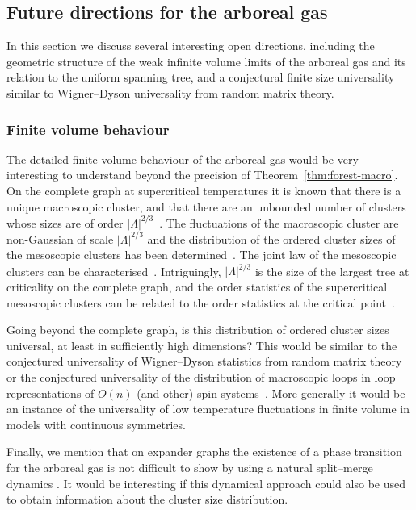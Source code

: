 \documentclass[11pt]{amsart}
\numberwithin{equation}{section}
\numberwithin{theorem}{section}
\newcommand{\1}{{\bf 1}}
\begin{document}
\subsection{Future directions for the arboreal gas}
\label{sec:conn-open-direct}

In this section we discuss several interesting open directions,
including the geometric structure of the weak infinite volume limits
of the arboreal gas and its relation to the uniform spanning tree, and
a conjectural finite size universality similar to Wigner--Dyson
universality from random matrix theory.

\subsubsection*{Finite volume behaviour}

The detailed finite volume behaviour of the arboreal gas would be very
interesting to understand beyond the precision of
Theorem~\ref{thm:forest-macro}.  On the complete graph at
supercritical temperatures it is known that there is a unique macroscopic
cluster, and that there are an unbounded number of clusters whose
sizes are of order $|\Lambda|^{2/3}$~\cite{MR1167294}. The
fluctuations of the macroscopic cluster are non-Gaussian of scale
$|\Lambda|^{2/3}$ and the distribution of the ordered cluster sizes of
the mesoscopic clusters has been determined~\cite{MR1167294}. The
joint law of the mesoscopic clusters can be
characterised~\cite[Section~1.4.3]{MR3845513}. Intriguingly, $|\Lambda|^{2/3}$ is the size of the largest tree at criticality on
the complete graph, and the order statistics of the supercritical
mesoscopic clusters can be related to the order statistics at
the critical point~\cite[Section~1.4.3]{MR3845513}.

Going beyond the complete graph, is this distribution of ordered
cluster sizes universal, at least in sufficiently high dimensions?
This would be similar to the conjectured universality of Wigner--Dyson
statistics from random matrix theory~\cite{MR1843511} or the conjectured universality of the distribution of
  macroscopic loops in loop representations of $O(n)$ (and other) spin systems~\cite{NahumEtAl,MR2868048}. 
More generally it would be an instance of the
universality of low temperature fluctuations in finite volume
in models with continuous symmetries.


Finally, we mention that on expander graphs the existence of a phase transition for the arboreal gas is not difficult to show by using
a natural split--merge dynamics \cite{MR3451159}.
It would be interesting if this dynamical approach
could also be used to obtain information about the cluster size distribution.
\end{document}

